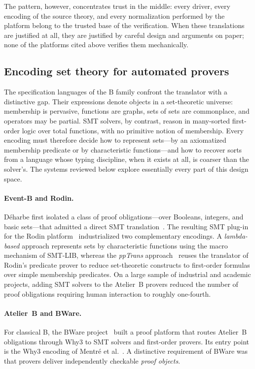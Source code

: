 The pattern, however, concentrates trust in the middle: every driver, every
encoding of the source theory, and every normalization performed by the
platform belong to the trusted base of the verification. When these
translations are justified at all, they are justified by careful design and
arguments on paper; none of the platforms cited above verifies them
mechanically.

\subsection{Encoding set theory for automated provers}
\label{subsec:rw-set-encodings}

The specification languages of the B family confront the translator with a
distinctive gap. Their expressions denote objects in a set-theoretic universe:
membership is pervasive, functions are graphs, sets of sets are commonplace,
and operators may be partial. SMT solvers, by contrast, reason in many-sorted
first-order logic over total functions, with no primitive notion of membership.
Every encoding must therefore decide how to represent sets---by an axiomatized
membership predicate or by characteristic functions---and how to recover sorts
from a language whose typing discipline, when it exists at all, is coarser than
the solver's. The systems reviewed below explore essentially every part of this
design space.

\paragraph*{Event-B and Rodin.}
D\'eharbe first isolated a class of proof obligations---over Booleans,
integers, and basic sets---that admitted a direct SMT
translation~\cite{deharbe2010automatic}. The resulting SMT plug-in for
the Rodin platform~\cite{deharbe2012smt} industrialized two complementary encodings. A
\emph{lambda-based} approach represents sets by characteristic functions using
the macro mechanism of SMT-LIB, whereas the \emph{ppTrans}
approach~\cite{deharbe2014integrating} reuses the translator of Rodin's
predicate prover to reduce set-theoretic constructs to first-order formulas
over simple membership predicates. On a large sample of industrial and academic
projects, adding SMT solvers to the Atelier~B provers reduced the number of
proof obligations requiring human interaction to roughly one-fourth.

\paragraph*{Atelier~B and BWare.}
For classical B, the BWare project~\cite{delahaye2014bware} built a proof
platform that routes Atelier~B obligations through Why3 to SMT solvers and
first-order provers. Its entry point is the Why3 encoding of Mentr\'e et
al.~\cite{mentre2012discharging}. A distinctive requirement of BWare was that
provers deliver independently checkable \emph{proof objects}.

